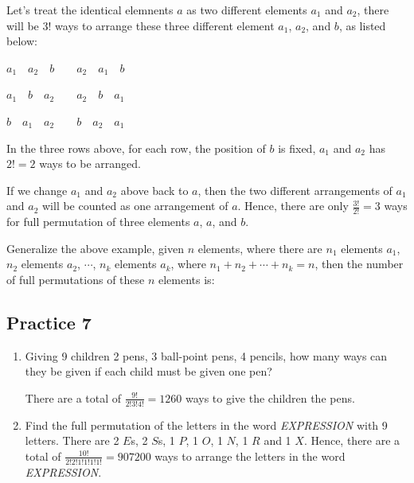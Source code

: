 \documentclass{report}
\begin{document}
\begin{multicols}{2}
  Let's treat the identical elemnents $a$ as two different elements $a_1$ and
  $a_2$, there will be 3! ways to arrange these three different element $a_1$,
  $a_2$, and $b$, as listed below:

  \begin{center}
    $a_1 \quad a_2 \quad b \qquad a_2 \quad a_1 \quad b$

    $a_1 \quad b \quad a_2 \qquad a_2 \quad b \quad a_1$

    $b \quad a_1 \quad a_2 \qquad b \quad a_2 \quad a_1$
  \end{center}

  In the three rows above, for each row, the position of $b$ is fixed, $a_1$ and
  $a_2$ has $2! = 2$ ways to be arranged.

  If we change $a_1$ and $a_2$ above back to $a$, then the two different
  arrangements of $a_1$ and $a_2$ will be counted as one arrangement of $a$.
  Hence, there are only $\frac{3!}{2!} = 3$ ways for full permutation of three
  elements $a$, $a$, and $b$.

  Generalize the above example, given $n$ elements, where there are $n_1$
  elements $a_1$, $n_2$ elements $a_2$, $\cdots$, $n_k$ elements $a_k$, where
  $n_1 + n_2 + \cdots + n_k = n$, then the number of full permutations of these
  $n$ elements is:
  \begin{cequation}
  \end{cequation}

  \subsection{Practice 7}

  \begin{enumerate}
    \item Giving 9 children 2 pens, 3 ball-point pens, 4 pencils, how many ways can they
          be given if each child must be given one pen? \sol{}

          There are a total of $\frac{9!}{2!3!4!} = 1260$ ways to give the children the
          pens.

    \item Find the full permutation of the letters in the word \textit{EXPRESSION} with 9
          letters. \sol{} There are 2 $E$s, 2 $S$s, 1 $P$, 1 $O$, 1 $N$, 1 $R$ and 1 $X$.
          Hence, there are a total of $\frac{10!}{2!2!1!1!1!1!} = 907200$ ways to arrange
          the letters in the word \textit{EXPRESSION}.
  \end{enumerate}


\end{multicols}
\end{document}
